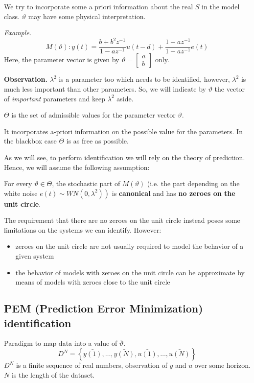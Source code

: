 We try to incorporate some a priori information about the real $S$ in the model class. $\vartheta$ may have some physical interpretation.

\emph{Example.}
$$
	M(\vartheta): y(t)=\frac{b+b^{2} z^{-1}}{1-a z^{-1}} u(t-d)+\frac{1+a z^{-1}}{1-a z^{-1}} e(t)
$$
Here, the parameter vector is given by $\vartheta=\begin{bmatrix}a \\ b\end{bmatrix}$ only.


\textbf{Observation.}
$\lambda^2$ is a parameter too which needs to be identified, however, $\lambda^2$ is much less important than other parameters. So, we will indicate by $\vartheta$ the vector of \emph{important} parameters and keep $\lambda^2$ aside.

$\Theta$ is the set of admissible values for the parameter vector $\vartheta$.

It incorporates a-priori information on the possible value for the parameters. In the blackbox case $\Theta$ is as free as possible.

As we will see, to perform identification we will rely on the theory of prediction. Hence, we will assume the following assumption:

For every $\vartheta \in \Theta$, the stochastic part of $M(\vartheta)$ (i.e. the part depending on the white noise $\left.e(t) \sim W N\left(0, \lambda^{2}\right)\right)$ is \textbf{canonical} and has \textbf{no zeroes on the unit circle}.

The requirement that there are no zeroes on the unit circle instead poses some limitations on the systems we can identify. However:
\begin{itemize}
	\item zeroes on the unit circle are not usually required to model the behavior of a given system
	\item the behavior of models with zeroes on the unit circle can be approximate by means of models with zeroes close to the unit circle
\end{itemize} 

\subsection{PEM (Prediction Error Minimization) identification}

Paradigm to map data into a value of $\bar{\vartheta}$.
$$
	D^N=\left\{\bar{y(1)},\ldots,\bar{y(N)},\bar{u(1)},\ldots,\bar{u(N)}\right\}
$$
$D^N$ is a finite sequence of real numbers, observation of $y$ and $u$ over some horizon. $N$ is the length of the dataset.

